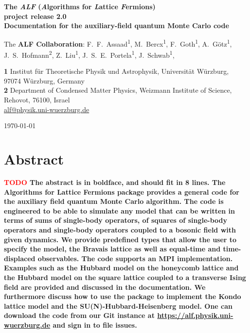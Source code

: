 \documentclass[submission, Phys]{SciPost}
\newcommand*{\red}{\textcolor{red}}
\begin{document}
	
\begin{center}{\Large \textbf{
The \emph{ALF} (\emph{A}lgorithms for \emph{L}attice \emph{F}ermions)\\project release 2.0\\
{\normalsize Documentation for the  auxiliary-field quantum Monte Carlo code}
}}\end{center}

\begin{center}
The \textbf{ALF Collaboration}:
F.~F.~Assaad\textsuperscript{1},
M.~Bercx\textsuperscript{1},
F.~Goth\textsuperscript{1},
A.~G\"otz\textsuperscript{1},
J.~S.~Hofmann\textsuperscript{2},
Z.~Liu\textsuperscript{1},
J.~S.~E.~Portela\textsuperscript{1},
J.~Schwab\textsuperscript{1},
\end{center}

\begin{center}
{\bf 1} Institut f\"ur Theoretische Physik und Astrophysik, Universit\"at W\"urzburg,\\
97074 W\"urzburg, Germany\\
{\bf 2} Department of Condensed Matter Physics, Weizmann Institute of Science,\\
Rehovot, 76100, Israel\\

\url{alf@physik.uni-wuerzburg.de}
\end{center}

\begin{center}
\today
\end{center}


\section*{Abstract}
{\bf
\red{ TODO } The abstract is in boldface, and should fit in 8 lines.
The Algorithms for Lattice Fermions package provides a general code for the auxiliary field quantum Monte Carlo algorithm. The code is engineered to be	able to simulate any model that can be written in terms of sums of single-body operators, of squares of single-body operators and single-body operators coupled to a bosonic field with given dynamics. We provide predefined types that allow the user to specify the model, the Bravais lattice as well as equal-time and time-displaced observables. The code supports an MPI implementation. Examples such as the Hubbard model on the honeycomb lattice and the Hubbard model on the square lattice coupled to a transverse Ising field are provided and discussed in the documentation. We furthermore discuss how to use the package to implement the Kondo lattice model and the SU(N)-Hubbard-Heisenberg model. One can download the code from our Git instance at \url{https://alf.physik.uni-wuerzburg.de} and sign in to file issues.
}\\
\end{document}
